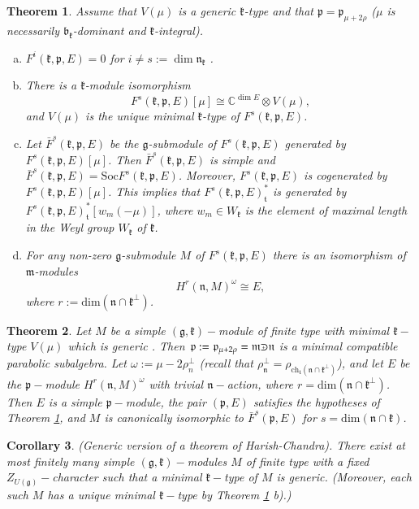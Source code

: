 \documentclass[default]{./styles/svmult}
\newtheorem{theo}{Theorem}[section]
\newtheorem{cor}[theo]{Corollary}
\newcommand{\Soc}{\mathrm{Soc}}
\newcommand{\field}[1]{\mathbb{#1}}
\newcommand{\bb}{\mathfrak{b}}
\renewcommand{\gg}{\mathfrak{g}}
\newcommand{\kk}{\mathfrak{k}}
\newcommand{\mm}{\mathfrak{m}}
\newcommand{\nn}{\mathfrak{n}}
\newcommand{\pp}{\mathfrak{p}}
\renewcommand{\tt}{\mathfrak{t}}
\def\crplus{\hbox{$\supset${\raise1.05pt\hbox{\kern -0.55em ${\scriptscriptstyle +}$}}\ }}
\begin{document}
\begin{theo}\label{th:4}
    Assume that $V(\mu)$ is a generic $\kk$-type and that $\pp=\pp_{\mu+2\rho}$ ($\mu$ is necessarily $\bb_\kk$-dominant and $\kk$-integral).
	\begin{enumerate}[a)]
	\item $F^i(\kk,\pp,E)=0$ for $i\neq s:=\dim\nn_\kk$ .
	\item There is a $\kk$-module isomorphism $$F^s(\kk,\pp,E)[\mu]\cong\field{C}^{\dim E}\otimes V(\mu),$$ and $V(\mu)$ is the unique minimal $\kk$-type of $F^s(\kk,\pp,E)$.
	\item Let $\bar{F}^s(\kk,\pp,E)$ be the $\gg$-submodule of $F^s(\kk,\pp,E)$ generated by $F^s(\kk,\pp,E)[\mu]$. Then $\bar{F}^s(\kk,\pp,E)$ is simple and $\bar{F}^s(\kk,\pp,E) = \Soc F^s(\kk,\pp,E)$. Moreover, $F^s(\kk,\pp,E)$ is cogenerated by $F^s(\kk,\pp,E)[\mu]$. This implies that $F^s(\kk,\pp,E)^*_\tt$ is generated by $F^s(\kk,\pp,E)^*_\tt[w_m(-\mu)]$, where $w_m\in W_\kk$  is the element of maximal length in the Weyl group $W_\kk$ of $\kk$.
	\item For any non-zero $\gg$-submodule $M$ of $F^s(\kk,\pp,E)$ there is an isomorphism of $\mm$-modules $$H^r(\nn,M)^\omega\cong E,$$ where $r := \mathrm{dim}(\nn\cap\kk^{\perp})$.
\end{enumerate}
\end{theo}

\begin{theo}\label{recth1}
 Let $M$ be a simple $(\gg,\kk)-$module of finite type with minimal $\kk-$type $V(\mu)$ which is generic . Then $\pp:=\pp_{\mu+2\rho} = \mm \crplus \nn$ is a minimal compatible parabolic subalgebra. Let $\omega:=\mu - 2\rho^{\perp}_n$ (recall that $\rho^{\perp}_\nn = \rho_{\mathrm{ch}_\tt(\nn \cap \kk^{\perp})}$), and let $E$ be the $\pp-$module $H^r(\nn,M)^{\omega}$ with trivial $\nn-$action, where $r = \mathrm{dim}(\nn\cap\kk^{\perp})$. Then $E$ is a simple $\pp-$module, the pair $(\pp,E)$ satisfies the hypotheses of Theorem \ref{th:4}, and $M$ is canonically isomorphic to $\bar{F}^s(\pp,E)$ for $s=\mathrm{dim}(\nn\cap\kk)$.
\end{theo}

\begin{cor}\label{corr1_pz2}
 (Generic version of a theorem of Harish-Chandra). There exist at most finitely many simple $(\gg,\kk)-$modules $M$ of finite type with a fixed $Z_{U(\gg)}-$character such that a minimal $\kk-$type of $M$ is generic. (Moreover, each such $M$ has a unique minimal $\kk-$type by Theorem \ref{th:4} b).)
\end{cor}
\end{document}
